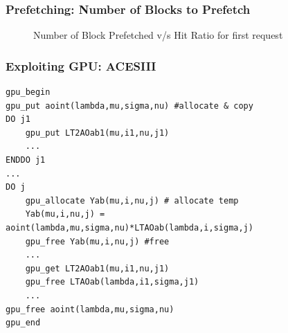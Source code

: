 \documentclass{beamer}
\begin{document}
\begin{frame}\frametitle{Prefetching: Number of Blocks to Prefetch}
  \pause
  \begin{figure}[h]
    \resizebox{.9\linewidth}{!}{}
    \caption{Number of Block Prefetched v/s Hit Ratio for first request}
  \end{figure}
\end{frame}

\begin{frame}[fragile=singleslide]\frametitle{Exploiting GPU: ACESIII}
\begin{lstlisting}
gpu_begin
gpu_put aoint(lambda,mu,sigma,nu) #allocate & copy
DO j1
    gpu_put LT2AOab1(mu,i1,nu,j1)
    ...
ENDDO j1
...
DO j
    gpu_allocate Yab(mu,i,nu,j) # allocate temp
    Yab(mu,i,nu,j) = aoint(lambda,mu,sigma,nu)*LTAOab(lambda,i,sigma,j)
    gpu_free Yab(mu,i,nu,j) #free
    ...
    gpu_get LT2AOab1(mu,i1,nu,j1)
    gpu_free LTAOab(lambda,i1,sigma,j1)
    ...
gpu_free aoint(lambda,mu,sigma,nu)
gpu_end
\end{lstlisting}
\end{frame}
\end{document}
